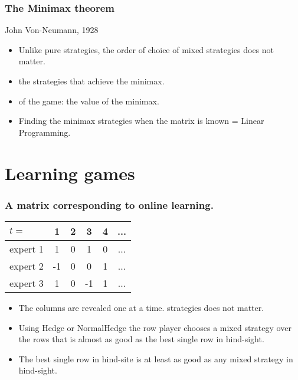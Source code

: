 \documentclass[handout]{beamer}
\begin{document}
\begin{frame}
\frametitle{The Minimax theorem}

John Von-Neumann, 1928\newline

\red{
\[
\max_{\vec{p}} \min_{\vec{q}} \vec{p} M \vec{q}^T
=
\min_{\vec{q}} \max_{\vec{p}} \vec{p} M \vec{q}^T
\]
}

\begin{itemize}
\item Unlike pure strategies, the order of choice of mixed
  strategies does not matter.
\item {} the strategies that achieve
  the minimax.
\item {} of the game: the value of the minimax.
\item Finding the minimax strategies when the matrix is known = Linear Programming.
\end{itemize}
\end{frame}

\section{Learning games}

\begin{frame}
\frametitle{A matrix corresponding to online learning.}
\begin{center}
\begin{tabular}{l|c|c|c|c|c|}
  $t=$   & 1  & 2 & 3 & 4 & ... \\
\hline
expert 1 & 1  & 0 & 1 & 0 & ...\\
\hline
expert 2 & -1 & 0 & 0 & 1 & ...\\
\hline
expert 3 &  1 & 0 & -1 & 1 & ...\\
\hline
\end{tabular}
\end{center}

\begin{itemize}
\item The columns are revealed one at a time.
  strategies does not matter.
\item Using Hedge or NormalHedge the row player chooses a mixed
  strategy over the rows that is almost as good as the best single row
  in hind-sight.
\item The best single row in hind-site is at least as good as any
  mixed strategy in hind-sight.
\end{itemize}
\end{frame}
\end{document}
